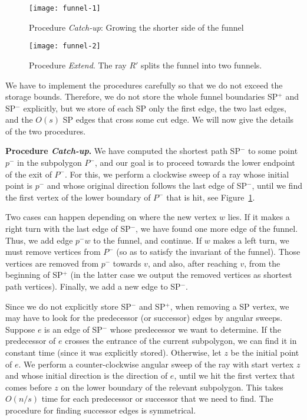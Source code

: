 \documentclass[11pt,a4paper]{article}
\begin{document}
\begin{figure}[htb]
\centerline{\texttt{[image: funnel-1]}}
\caption{Procedure \emph{Catch-up}: Growing the shorter side of the funnel}
\label{fig:funnel-1}
\end{figure}

\begin{figure}[htb]
\centerline{\texttt{[image: funnel-2]}}
\caption{Procedure \emph{Extend}. The ray $R'$ splits the funnel into two funnels.}
\label{funnel-2}
\end{figure}


We have to implement the procedures carefully so that we do not exceed the
storage bounds.  Therefore, we do not store the whole funnel boundaries
SP$^+$ and SP$^-$ explicitly, but we store of each SP only the first edge,
the two last edges, and the $O(s)$ SP edges that cross some cut edge.
We will now give the details of the two procedures.

\noindent
\textbf{Procedure \emph{Catch-up}.}
We have computed the shortest path SP$^-$ to some point
$p^-$ in the subpolygon
$P^-$, and our goal is to proceed towards
the lower endpoint of the exit of $P^-$.
For this, we perform a clockwise sweep of a ray whose initial point is $p^{-}$
and whose original direction follows the last edge of SP$^{-}$, until we
find the first vertex of the lower boundary of $P^{-}$ that is hit,
see Figure~\ref{fig:funnel-1}.

Two cases can happen depending on where the new vertex $w$ lies. If it
makes a right turn with the last edge of SP$^{-}$, we have found
one more edge of the funnel. Thus, we add edge $p^-w$ to the funnel, and
continue. If $w$ makes a left turn, we must remove vertices from $P^{-}$
(so as to satisfy the invariant of the funnel). Those vertices are
removed from $p^-$ towards $v$,
and also, after reaching $v$, from the beginning of SP$^+$ (in the
latter case we output the removed vertices as shortest path vertices).
Finally, we add a new edge to SP$^-$.

Since we do not explicitly store SP$^-$ and SP$^+$, when removing a SP vertex,
we may have to look for the
predecessor (or successor) edges by angular sweeps.
Suppose $e$ is an edge of SP$^-$ whose predecessor we want to determine.
If the predecessor of $e$ crosses the entrance of the current subpolygon,
we can find it in constant time (since it was explicitly stored).
Otherwise, let $z$ be the initial point of $e$.
We perform a counter-clockwise angular sweep of the ray with
start vertex $z$ and whose initial direction is the direction of $e$,
until we hit the first vertex that comes before $z$
on the lower boundary of the relevant subpolygon.  This takes
$O(n/s)$ time for each predecessor or successor that we need to find.
The procedure for finding successor edges is symmetrical.
\end{document}
